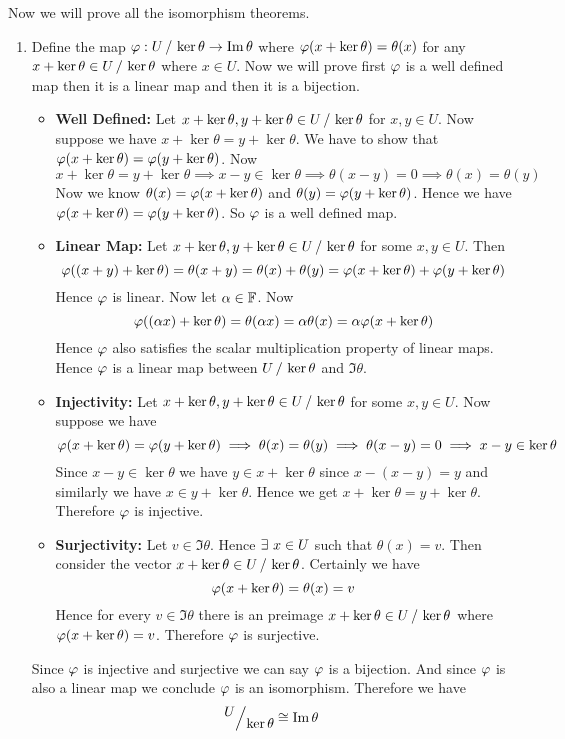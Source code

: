\documentclass[a4paper, 11pt]{article}
\begin{document}
{Now we will prove all the isomorphism theorems.
	\begin{enumerate}[label=(\alph*)]
		\item Define the map $\vph:\quotient{U}{\ker\theta}\to \Im \theta$ where $\varphi(x+\ker\theta)=\theta(x)$ for any $x+\ker\theta\in \quotient{U}{\ker\theta}$ where $x\in U$. Now we will prove first $\varphi $ is a well defined map then it is a linear map and then it is a bijection.
	\begin{itemize}
		\item \textbf{{Well Defined:}} Let $x+\ker\theta,y+\ker\theta\in \quotient{U}{\ker\theta}$ for $x,y\in U$. Now suppose we have $x+\ker\theta=y+\ker\theta$. We have to show that $\varphi(x+\ker\theta)=\varphi(y+\ker\theta)$. Now  $$x+\ker\theta=y+\ker\theta\implies x-y\in\ker\theta\implies \theta(x-y)=0\implies \theta(x)=\theta(y)$$Now we know $\theta(x)=\varphi(x+\ker\theta)$ and $\theta(y)=\varphi(y+\ker\theta)$. Hence we have $ \varphi(x+\ker\theta)=\varphi(y+\ker\theta)$. So $\varphi$ is a well defined map.
		\item \textbf{Linear Map:} Let $x+\ker\theta,y+\ker\theta\in \quotient{U}{\ker\theta}$ for some $x,y\in U$. Then $$\varphi((x+y)+\ker\theta)=\theta(x+y)=\theta(x)+\theta(y)=\varphi(x+\ker\theta)+\varphi(y+\ker\theta)$$Hence $\varphi$ is linear. Now let $\alpha\in \mathbb{F}$. Now $$\varphi((\alpha x)+\ker\theta)=\theta(\alpha x)=\alpha \theta(x)=\alpha\varphi(x+\ker\theta)$$Hence $\varphi$  also satisfies the scalar multiplication property of linear maps. Hence $\varphi$ is a linear map between $\quotient{U}{\ker\theta}$ and $\Im\theta$. 
		\item \textbf{Injectivity:} Let $x+\ker\theta, y+\ker\theta\in \quotient{U}{\ker\theta}$ for some $x,y\in U$. Now suppose we have $$\varphi(x+\ker\theta)=\varphi(y+\ker\theta)\implies \theta(x)=\theta(y)\implies \theta(x-y)=0\implies x-y\in\ker\theta$$Since $x-y\in\ker\theta $ we have $y\in x+\ker\theta$ since $x-(x-y)=y$ and similarly we have $x\in y+\ker\theta$. Hence we get $x+\ker\theta=y+\ker\theta$. Therefore $\varphi$ is injective. 
		\item \textbf{Surjectivity:} Let $v\in \Im\theta$. Hence $\exists\ x\in U$ such that $\theta(x)=v$. Then consider the vector $x+\ker\theta\in \quotient{U}{\ker\theta}$. Certainly we have $$\varphi(x+\ker\theta)=\theta(x)=v$$Hence  for every $v\in \Im\theta$ there is an preimage $x+\ker\theta\in \quotient{U}{\ker\theta}$  where $\varphi(x+\ker\theta)=v$. Therefore $\varphi$ is surjective. 
	\end{itemize}
Since $\varphi$ is injective and surjective we can say $\varphi$ is a bijection. And since $\varphi$ is also a linear map we conclude $\varphi$ is an isomorphism. Therefore we have $$\quotient{U}{\ker\theta}\cong \Im \theta$$

\end{enumerate}}
\end{document}

